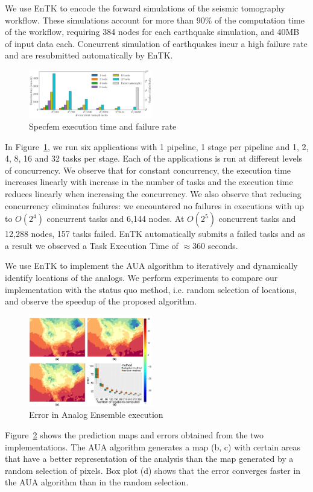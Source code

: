 We use EnTK to encode the forward simulations of the seismic tomography 
workflow. These simulations account for more than 90\% of the computation time 
of the workflow, requiring 384 nodes for each earthquake simulation, and 40MB
of input data each. Concurrent simulation of earthquakes incur a high failure 
rate and are resubmitted automatically by EnTK.

\begin{figure} 
\includegraphics[width=0.48\textwidth]{figs/specfem_exec_time_varying_concurrency_titan.pdf}
\caption{Specfem execution time and failure rate}\label{fig:specfem}
\end{figure}

In Figure~\ref{fig:specfem}, we run six applications with 1 pipeline, 1 stage 
per pipeline and 1, 2, 4, 8, 16 and 32 tasks per stage. Each of the applications
is run at different levels of concurrency. We observe that for constant
concurrency, the execution time increases linearly with increase in the number 
of tasks and the execution time reduces linearly when increasing the 
concurrency. We also observe that reducing concurrency eliminates failures: we 
encountered no failures in executions with up to $O(2^4)$ concurrent tasks and 
6,144 nodes. At $O(2^5)$ concurrent tasks and 12,288 nodes, 157 tasks failed. 
EnTK automatically submits a failed tasks and as a result we observed a Task 
Execution Time of \(\approx\)360 seconds.


We use EnTK to implement the AUA algorithm to iteratively and dynamically 
identify locations of the analogs. We perform experiments to compare our 
implementation with the status quo method, i.e. random selection of locations, 
and observe the speedup of the proposed algorithm.

\begin{figure} 
\includegraphics[width=0.48\textwidth]{figs/EX_PSU_error_plot_2x2.pdf}
\caption{Error in Analog Ensemble execution}\label{fig:anen}
\end{figure}

Figure~\ref{fig:anen} shows the prediction maps and errors obtained from the two
implementations. The AUA algorithm generates a map (b, c) with certain 
areas that have a better representation of the analysis than the map generated 
by a random selection of pixels. Box plot (d) shows that the error converges 
faster in the AUA algorithm than in the random selection.